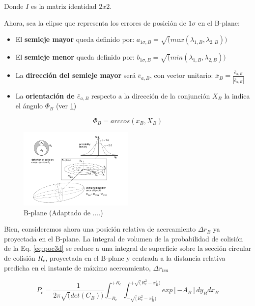 Donde $I$ es la matriz identidad $2x2$.

Ahora, sea la elipse que representa los errores de posici\'on de $1\sigma$ en el B-plane:\\

\begin{itemize}
\item El {\bf{semieje mayor}} queda definido por: $a_{1\sigma,B}=\sqrt(max(\lambda_{1,B},\lambda_{2,B}))$
\item El {\bf{semieje menor}} queda definido por: $b_{1\sigma,B}=\sqrt(min(\lambda_{1,B},\lambda_{2,B}))$
\item La {\bf{direcci\'on del semieje mayor}} ser\'a $\bar{e}_{a,B}$, con vector unitario: $ \bar{x}_{B}=\frac{\bar{e}_{a,B}}{|\bar{e}_{a,B}|}$
\item La {\bf{orientaci\'on de $\bar{e}_{a,B}$}} respecto a la direcci\'on de la conjunci\'on $X_{B}$ la indica el \'angulo $\Phi_{B}$ (ver \ref{fig:bplane})
\end{itemize}

\begin{equation}
\Phi_{B}= arccos(\bar{x}_{B},X_{B})
\end{equation}

\begin{figure}[!h]
\centering
\includegraphics[width=0.5\textwidth]{imagenes/akellabplane}
\caption{ B-plane (Adaptado de ....)}
\label{fig:bplane}
\end{figure}

Bien, consideremos ahora una posici\'on relativa de acercamiento $\Delta r_{B}$ ya proyectada en el B-plane. La integral de volumen de la probabilidad de colisi\'on de la Eq. \ref{eq:poc3d} se reduce a una integral de superficie sobre la secci\'on circular de colisi\'on $R_{c}$, proyectada en el B-plane y centrada a la distancia relativa predicha en el instante de m\'aximo acercamiento, $\Delta r_{tca}$

\begin{equation}
P_{c} = \frac{1}{2 \pi \sqrt(det(C_{B}))} \int_{-R_{c}}^{+R_{c}} \int_{-\sqrt(R^{2}_{c}-x^{2}_{B})}^{+\sqrt(R^{2}_{c}-x^{2}_{B})} exp [- A_{B}] dy_{B} dx_{B}
\end{equation}

